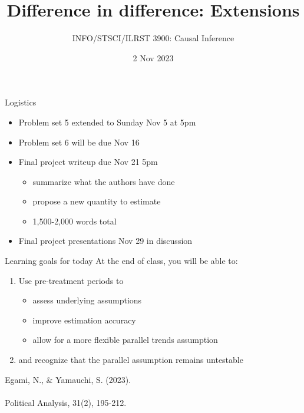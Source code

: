 \documentclass{beamer}
\title{Difference in difference: Extensions}
\author{INFO/STSCI/ILRST 3900: Causal Inference}
\date{2 Nov 2023}
\newcommand\bref[2]{\href{#1}{\color{blue}{#2}}}
\newcommand{\goalsframe}{\begin{frame}{Learning goals for today}
At the end of class, you will be able to:
\begin{enumerate}
\item Use pre-treatment periods to
\begin{itemize}
\item assess underlying assumptions
\item improve estimation accuracy
\item allow for a more flexible parallel trends assumption
\end{itemize}
\item and recognize that the parallel assumption remains untestable
\end{enumerate}
\end{frame}}
\begin{document}
\maketitle

\begin{frame}{Logistics} \pause
\begin{itemize}
\item Problem set 5 extended to Sunday Nov 5 at 5pm
\item Problem set 6 will be due Nov 16
\item  Final project writeup due Nov 21 5pm
\begin{itemize}
\item summarize what the authors have done
\item propose a new quantity to estimate
\item 1,500-2,000 words total
\end{itemize}
\item Final project presentations Nov 29 in discussion
\end{itemize}
\end{frame}

\goalsframe

\begin{frame}
Egami, N., \& Yamauchi, S. (2023).\\\bref{https://doi.org/10.1017/pan.2022.8}{Using multiple pretreatment periods to improve difference-in-differences and staggered adoption designs.}\\Political Analysis, 31(2), 195-212.
\end{frame}
\end{document}
